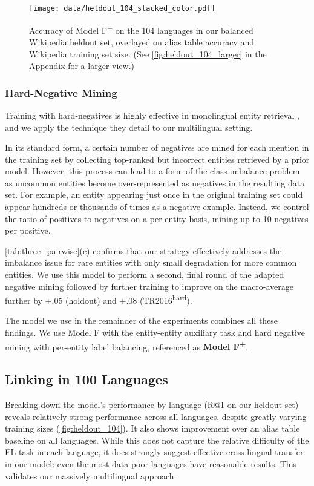 \documentclass[11pt,a4paper]{article}
\newcommand*{\TR}{TR2016\textsuperscript{hard}}
\begin{document}
\begin{figure*}
  \centering
  \texttt{[image: data/heldout\_104\_stacked\_color.pdf]}
\vspace{-2.8em}
  \caption{Accuracy of Model F\textsuperscript{+} on the 104 languages in our balanced Wikipedia heldout set, overlayed on alias table accuracy and Wikipedia training set size. (See \autoref{fig:heldout_104_larger} in the Appendix for a larger view.)
  \label{fig:heldout_104}}
\end{figure*}

\subsubsection{Hard-Negative Mining}
Training with hard-negatives is highly effective in monolingual entity retrieval
\citep{gillick-etal-2019-learning}, and we apply the technique they detail to our multilingual setting.

In its standard form, a certain number of negatives are mined for each mention in the training set by collecting top-ranked but incorrect entities retrieved by a prior model.
However, this process can lead to a form of the class imbalance problem as uncommon entities become over-represented as negatives in the resulting data set.
For example, an entity appearing just once in the original training set could appear hundreds or thousands of times as a negative example.
Instead, we control the ratio of positives to negatives on a per-entity basis, mining up to 10 negatives per positive.

\autoref{tab:three_pairwise}(c)
confirms that our strategy effectively addresses the imbalance issue for rare entities with only small degradation for more common entities.
We use this model to perform a second, final round
of the adapted negative mining followed by further training to improve on the macro-average further by +.05 (holdout) and +.08 (\TR{}).

The model we use in the remainder of the experiments combines all these findings. We use Model F with the entity-entity auxiliary task and hard negative mining with per-entity label balancing, referenced as
\textbf{Model F\textsuperscript{+}}.

\subsection{Linking in 100 Languages}\label{sec:linking_in_100}
Breaking down the model's performance by language (R@1 on our heldout set) reveals relatively strong performance across all languages,
despite greatly varying training sizes (\autoref{fig:heldout_104}).
It also shows improvement over an alias table baseline on all languages.
While this does not capture the relative difficulty of the EL task in each language, it does strongly suggest effective cross-lingual transfer in our model: even the most data-poor languages have reasonable results.
This validates our massively multilingual approach.
\end{document}
